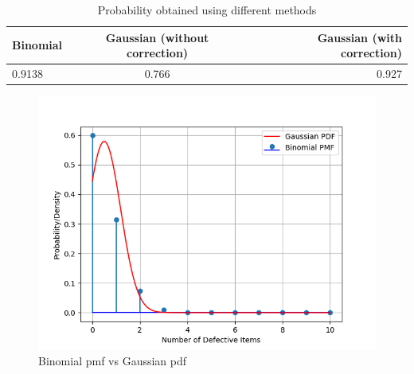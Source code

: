 \documentclass[]{article}
\begin{document}
\begin{enumerate}
\begin{table}[!ht]
\centering
\begin{tabular}{|l|c|r|}
    \hline
    Binomial & Gaussian (without correction) & Gaussian (with correction)\\
    \hline
    0.9138 & 0.766 & 0.927\\
    \hline
\end{tabular}
\caption{Probability obtained using different methods}
\label{tab:gaussian/9/3/7/1}
\end{table}
\begin{figure}[!ht]
\includegraphics[width=\columnwidth]{ncert/9/3/7/figs/fig.png}
\caption{Binomial pmf vs Gaussian pdf}
\label{fig:gaussian/9/3/7/2}
\end{figure}
\end{enumerate}
\end{document}
